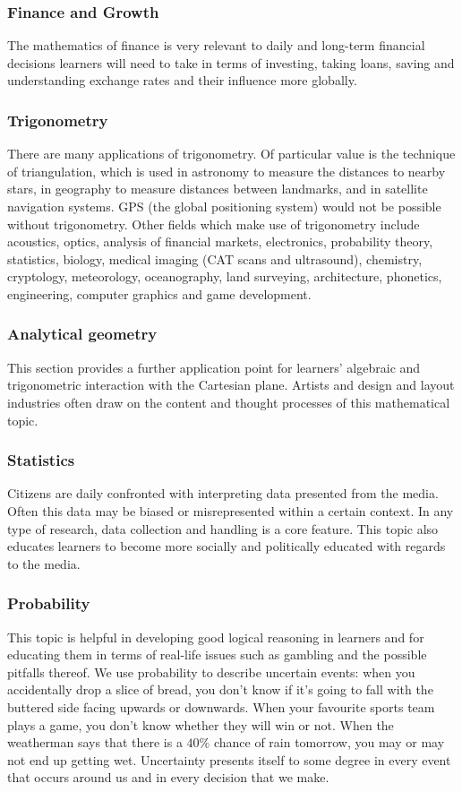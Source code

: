 \subsubsection{Finance and Growth }
The mathematics of finance is very relevant to daily and long-term financial decisions learners will need to take in terms of investing, taking loans, saving and understanding exchange rates and their influence more globally.
\subsubsection{Trigonometry}
There are many applications of trigonometry. Of particular value is the technique of triangulation, which is used in astronomy to measure the distances to nearby stars, in geography to measure distances between landmarks, and in satellite navigation systems. GPS (the global positioning system) would not be possible without trigonometry. Other fields which make use of trigonometry include acoustics, optics, analysis of financial markets, electronics, probability theory, statistics, biology, medical imaging (CAT scans and ultrasound), chemistry, cryptology, meteorology, oceanography, land surveying, architecture, phonetics, engineering, computer graphics and game development.
\subsubsection{Analytical geometry}
This section provides a further application point for learners’ algebraic and trigonometric interaction with the Cartesian plane. Artists and design and layout industries often draw on the content and thought processes of this mathematical topic.
\subsubsection{Statistics}
Citizens are daily confronted with interpreting data presented from the media. Often this data may be biased or misrepresented within a certain context. In any type of research, data collection and handling is a core feature. This topic also educates learners to become more socially and politically educated with regards to the media.
\subsubsection{Probability}
This topic is helpful in developing good logical reasoning in learners and for educating them in terms of real-life issues such as gambling and the possible pitfalls thereof. We use probability to describe uncertain events: when you accidentally drop a slice of bread, you don’t know if it’s going to fall with the buttered side facing upwards or downwards. When your favourite sports team plays a game, you don’t know whether they will win or not. When the weatherman says that there is a $40\%$ chance of rain tomorrow, you may or may not end up getting wet. Uncertainty presents itself to some degree in every event that occurs around us and in every decision that we make.

